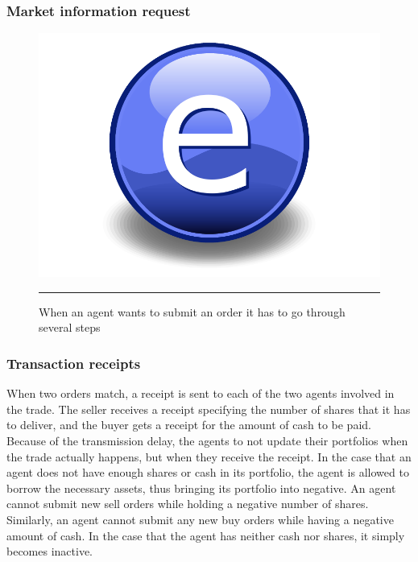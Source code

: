 \subsubsection{Market information request}

\begin{figure}[htbp]
	\centering
		\includegraphics{Figures/Electron.pdf}
		\rule{35em}{0.5pt}
	\caption{When an agent wants to submit an order it has to go through several steps}
	\label{fig:information_exchange}
\end{figure}





\subsubsection{Transaction receipts}
When two orders match, a receipt is sent to each of the two agents involved in the trade. The seller receives a receipt specifying the number of shares that it has to deliver, and the buyer gets a receipt for the amount of cash to be paid. Because of the transmission delay, the agents to not update their portfolios when the trade actually happens, but when they receive the receipt. In the case that an agent does not have enough shares or cash in its portfolio, the agent is allowed to borrow the necessary assets, thus bringing its portfolio into negative. An agent cannot submit new sell orders while holding a negative number of shares. Similarly, an agent cannot submit any new buy orders while having a negative amount of cash. In the case that the agent has neither cash nor shares, it simply becomes inactive.

